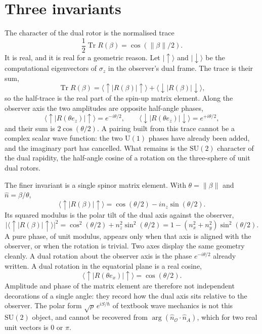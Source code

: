 \documentclass[a4paper]{article}
\begin{document}
\section{Three invariants}

The character of the dual rotor is the normalised trace
\[
\frac12\operatorname{Tr} R(\beta)=\cos(\lVert\beta\rVert/2).
\]
It is real, and it is real for a geometric reason. Let \(\lvert\uparrow\rangle\) and \(\lvert\downarrow\rangle\) be the computational eigenvectors of \(\sigma_z\) in the observer's dual frame. The trace is their sum,
\[
\operatorname{Tr} R(\beta)
  =\langle\uparrow\rvert R(\beta)\lvert\uparrow\rangle
  +\langle\downarrow\rvert R(\beta)\lvert\downarrow\rangle,
\]
so the half-trace is the real part of the spin-up matrix element. Along the observer axis the two amplitudes are opposite half-angle phases,
\[
\langle\uparrow\rvert R(\theta e_z)\lvert\uparrow\rangle=e^{-i\theta/2},\qquad
\langle\downarrow\rvert R(\theta e_z)\lvert\downarrow\rangle=e^{+i\theta/2},
\]
and their sum is \(2\cos(\theta/2)\). A pairing built from this trace cannot be a complex scalar wave function: the two \(\mathrm{U}(1)\) phases have already been added, and the imaginary part has cancelled. What remains is the \(\mathrm{SU}(2)\) character of the dual rapidity, the half-angle cosine of a rotation on the three-sphere of unit dual rotors.

The finer invariant is a single spinor matrix element. With \(\theta=\lVert\beta\rVert\) and \(\hat n=\beta/\theta\),
\[
\langle\uparrow\rvert R(\beta)\lvert\uparrow\rangle
  =\cos(\theta/2)-i n_z\sin(\theta/2).
\]
Its squared modulus is the polar tilt of the dual axis against the observer,
\[
\bigl\lvert\langle\uparrow\rvert R(\beta)\lvert\uparrow\rangle\bigr\rvert^2
  =\cos^2(\theta/2)+n_z^2\sin^2(\theta/2)
  =1-(n_x^2+n_y^2)\sin^2(\theta/2).
\]
A pure phase, of unit modulus, appears only when that axis is aligned with the observer, or when the rotation is trivial. Two axes display the same geometry cleanly. A dual rotation about the observer axis is the phase \(e^{-i\theta/2}\) already written. A dual rotation in the equatorial plane is a real cosine,
\[
\langle\uparrow\rvert R(\theta e_x)\lvert\uparrow\rangle=\cos(\theta/2).
\]
Amplitude and phase of the matrix element are therefore not independent decorations of a single angle: they record how the dual axis sits relative to the observer. The polar form \(\sqrt{\rho}\,e^{iS/\hbar}\) of textbook wave mechanics is not this \(\mathrm{SU}(2)\) object, and cannot be recovered from \(\arg(\hat n_{\mathcal{O}}\cdot\hat n_A)\), which for two real unit vectors is \(0\) or \(\pi\).
\end{document}
